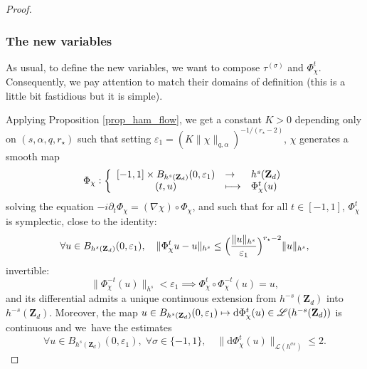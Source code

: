 \documentclass[11pt]{article}
\providecommand{\dpl}{\displaystyle}
\newcommand\mto{\mathchoice{\longmapsto}{\mapsto}{\mapsto}{\mapsto}}
\theoremstyle{definition}
\begin{document}
\begin{proof}
\subsubsection*{The new variables}
As usual, to define the new variables, we want to compose $\tau^{(\sigma)}$ and $\Phi_\chi^t$. Consequently, we pay attention to match their domains of definition (this is a little bit fastidious but it is simple).

Applying Proposition \ref{prop_ham_flow}, we get a constant $K>0$ depending only on $(s,\alpha,q,r_\star)$ such that setting $\varepsilon_1 = (K \|\chi \|_{q,\alpha})^{-1/(r_\star-2)}$, $\chi$ generates a smooth map
\[
\Phi_\chi: \left\{ \begin{array}{cll} [-1,1] \times B_{h^s(\mathbf{Z}_d)}(0,\varepsilon_1) &\dpl\to& h^s(\mathbf{Z}_d) \\ (t,u) &\dpl\mto& \Phi_\chi^t(u) \end{array} \right.
\]
solving the equation
$
-i\partial_t \Phi_\chi = (\nabla \chi)\circ \Phi_\chi$,
and such that for all $t\in [-1,1]$, $\Phi_\chi^t$ is symplectic, close to the identity:
\begin{equation}
\label{eq_dindon_new}
\forall u \in B_{h^s(\mathbf{Z}_d)}(0,\varepsilon_1), \quad \| \Phi_\chi^t u - u \|_{h^s} \leq \Bigl(\frac{\| u \|_{h^s}}{\varepsilon_1}\Bigr)^{r_\star-2} \| u \|_{h^s},
\end{equation}
invertible:
\begin{equation}
\label{eq_invertibility_new}
\|\Phi_\chi^{-t} (u) \|_{h^s} < \varepsilon_1 \implies \Phi_\chi^{t}\circ \Phi_\chi^{-t} (u) = u,
\end{equation}
and its differential admits a unique continuous extension from $h^{-s}(\mathbf{Z}_d)$ into $h^{-s}(\mathbf{Z}_d)$. Moreover, the map $u\in B_{h^s(\mathbf{Z}_d)}(0,\varepsilon_1) \mto \mathrm{d} \Phi_\chi^t(u) \in \mathscr{L}(h^{-s}(\mathbf{Z}_d))$ is continuous and we~have the estimates
\begin{equation}
\label{eq_petanque_new}
\forall u \in B_{h^s(\mathbf{Z}_d)}(0,\varepsilon_1),\;\forall \sigma\in \{-1,1\},\quad \| \mathrm{d} \Phi_\chi^t (u)\|_{\mathscr{L}(h^{\sigma s})}\leq 2.
\end{equation}


\end{proof}
\end{document}
